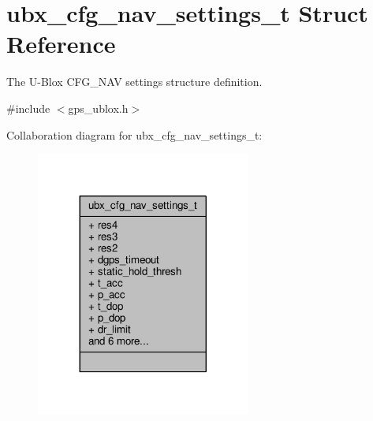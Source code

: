 \hypertarget{structubx__cfg__nav__settings__t}{\section{ubx\+\_\+cfg\+\_\+nav\+\_\+settings\+\_\+t Struct Reference}
\label{structubx__cfg__nav__settings__t}
}


The U-\/\+Blox C\+F\+G\+\_\+\+N\+A\+V settings structure definition.  




{\ttfamily \#include $<$gps\+\_\+ublox.\+h$>$}



Collaboration diagram for ubx\+\_\+cfg\+\_\+nav\+\_\+settings\+\_\+t\+:
\nopagebreak
\begin{figure}[H]
\begin{center}
\leavevmode
\includegraphics[width=200pt]{structubx__cfg__nav__settings__t__coll__graph}
\end{center}
\end{figure}
